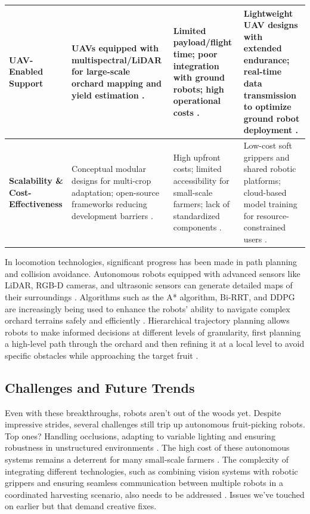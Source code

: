 \documentclass[a4paper,fleqn]{cas-dc}
\begin{document}
\begin{table}[htbp]
\begin{tabular}{p{}p{}p{}p{}}
    \midrule
    \textbf{UAV-Enabled Support} & UAVs equipped with multispectral/LiDAR for large-scale orchard mapping and yield estimation \cite{mohamed2021smart, martos2021ensuring}. & Limited payload/flight time; poor integration with ground robots; high operational costs \cite{martos2021ensuring}. & Lightweight UAV designs with extended endurance; real-time data transmission to optimize ground robot deployment \cite{mohamed2021smart, martos2021ensuring}. \\
    \midrule
    \textbf{Scalability \& Cost-Effectiveness} & Conceptual modular designs for multi-crop adaptation; open-source frameworks reducing development barriers \cite{lytridis2021overview, zhang2024automatic}. & High upfront costs; limited accessibility for small-scale farmers; lack of standardized components \cite{zhang2024automatic, navas2021soft}. & Low-cost soft grippers and shared robotic platforms; cloud-based model training for resource-constrained users \cite{lytridis2021overview, navas2021soft}. \\
    \bottomrule
  \end{tabular}
  \label{tab:trends_summary}
\end{table}

In locomotion technologies, significant progress has been made in path planning and collision avoidance. Autonomous robots equipped with advanced sensors like LiDAR, RGB-D cameras, and ultrasonic sensors can generate detailed maps of their surroundings \cite{liu2024hierarchical}. Algorithms such as the A* algorithm, Bi-RRT, and DDPG are increasingly being used to enhance the robots' ability to navigate complex orchard terrains safely and efficiently \cite{gai2022fruit, rajendran2024towards}. Hierarchical trajectory planning allows robots to make informed decisions at different levels of granularity, first planning a high-level path through the orchard and then refining it at a local level to avoid specific obstacles while approaching the target fruit \cite{liu2024hierarchical}.

\subsection{ Challenges and Future Trends }
Even with these breakthroughs, robots aren't out of the woods yet. 
Despite impressive strides, several challenges still trip up autonomous fruit-picking robots. Top ones? Handling occlusions, adapting to variable lighting and ensuring robustness in unstructured environments 
 \cite{hou2023overview, suresh2023selective}. The high cost of these autonomous systems remains a deterrent for many small-scale farmers \cite{zhang2024automatic}. The complexity of integrating different technologies, such as combining vision systems with robotic grippers and ensuring seamless communication between multiple robots in a coordinated harvesting scenario, also needs to be addressed \cite{li2023multi, rajendran2024towards}. Issues we've touched on earlier but that demand creative fixes. 
 
\end{document}
